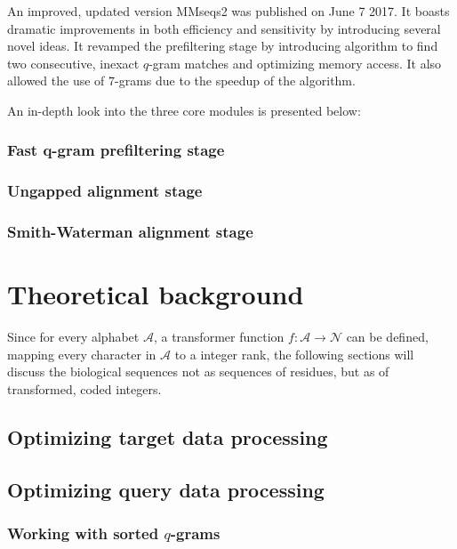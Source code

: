 \documentclass[11pt,a4paper]{scrartcl}
\newcommand{\Alpha}[0]{\mathcal{A}}
\begin{document}

An improved, updated version MMseqs2 was published on June 7 2017. It boasts dramatic improvements in both efficiency and sensitivity by introducing several novel ideas. It revamped the prefiltering stage by introducing algorithm to find two consecutive, inexact \(q\)-gram matches and optimizing memory access. It also allowed the use of \(7\)-grams due to the speedup of the algorithm. %

An in-depth look into the three core modules is presented below:
\subsubsection{Fast q-gram prefiltering stage}

\subsubsection{Ungapped alignment stage}

\subsubsection{Smith-Waterman alignment stage}

\section{Theoretical background}
Since for every alphabet \(\Alpha\), a transformer function \(f:\Alpha \rightarrow \mathcal{N}\) can be defined, mapping every character in \(\Alpha\) to a integer rank, the following sections will discuss the biological sequences not as sequences of residues, but as of transformed, coded integers.
\subsection{Optimizing target data processing}

\subsection{Optimizing query data processing}

\subsubsection{Working with sorted \(q\)-grams}

\end{document}
